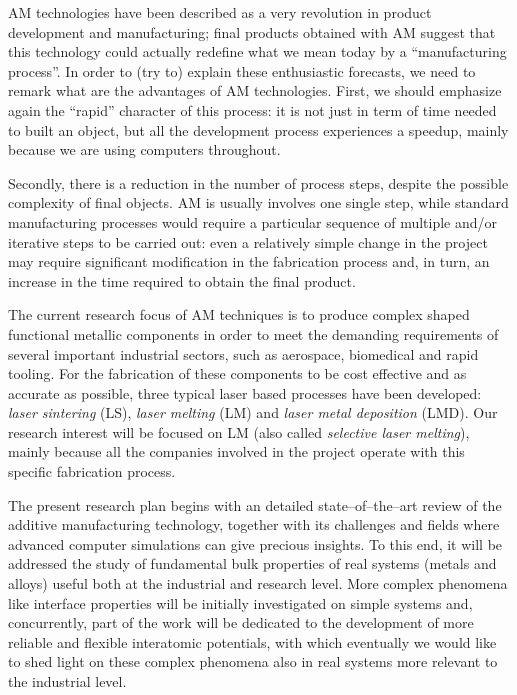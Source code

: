 
AM technologies have been described as a very revolution in product development and manufacturing; final products obtained with AM suggest that this technology could actually redefine what we mean today by a ``manufacturing process''. In order to (try to) explain these enthusiastic forecasts, we need to remark what are the advantages of AM technologies. First, we should emphasize again the ``rapid'' character of this process: it is not just in term of time needed to built an object, but all the development process experiences a speedup, mainly because we are using computers throughout. %

Secondly, there is a reduction in the number of process steps, despite the possible complexity of final objects. AM is usually involves one single step, while standard manufacturing processes would require a particular sequence of multiple and/or iterative steps to be carried out: even a relatively simple change in the project may require significant modification in the fabrication process and, in turn, an increase in the time required to obtain the final product.

The current research focus of AM techniques is to produce complex shaped functional metallic components in order to meet the demanding requirements of several important industrial sectors, such as aerospace, biomedical and rapid tooling.
For the fabrication of these components to be cost effective and as accurate as possible, three typical laser based processes have been developed: \emph{laser sintering} (LS), \emph{laser melting} (LM) and \emph{laser metal deposition} (LMD). Our research interest will be focused on LM (also called \emph{selective laser melting}), mainly because all the companies involved in the project operate with this specific fabrication process.

The present research plan begins with an detailed state--of--the--art review of the additive manufacturing technology, together with its challenges and fields where advanced computer simulations can give precious insights. To this end, it will be addressed the study of fundamental bulk properties of real systems (metals and alloys) useful both at the industrial and research level. More complex phenomena like interface properties will be initially investigated on simple systems and, concurrently, part of the work will be dedicated to the development of more reliable and flexible interatomic potentials, with which eventually we would like to shed light on these complex phenomena also in real systems more relevant to the industrial level.













